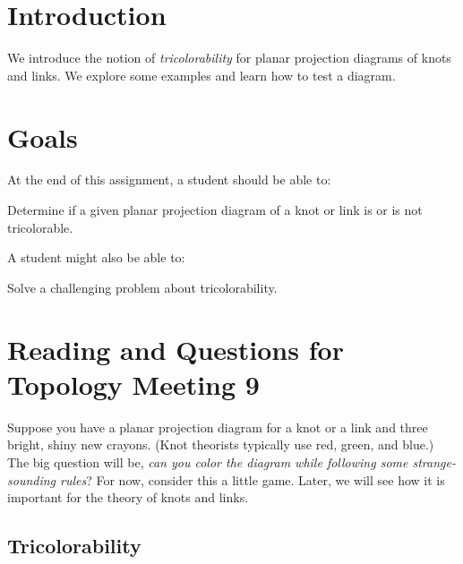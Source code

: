 \documentclass[12pt,letterpaper]{article}
\theoremstyle{definition}
\begin{document}
\setlength{\parskip}{1ex plus 0.5ex minus 0.2ex}
\setlength{\parindent}{0pt}

\pagestyle{fancy}
\cfoot{}

\section*{Introduction}
We introduce the notion of \emph{tricolorability} for planar projection diagrams of knots and links. 
We explore some examples and learn how to test a diagram.

\section*{Goals}
At the end of this assignment, a student should be able to:
\begin{compactitem}
\item Determine if a given planar projection diagram of a knot or link is or is not tricolorable.
\end{compactitem}
A student might also be able to:
\begin{compactitem}
\item Solve a challenging problem about tricolorability.
\end{compactitem}

\section*{Reading and Questions for Topology Meeting 9}

Suppose you have a planar projection diagram for a knot or a link and three bright, shiny new crayons.
(Knot theorists typically use red, green, and blue.)
The big question will be, \emph{can you color the diagram while following some strange-sounding rules}?
For now, consider this a little game.
Later, we will see how it is important for the theory of knots and links.

\subsection*{Tricolorability}
\end{document}
